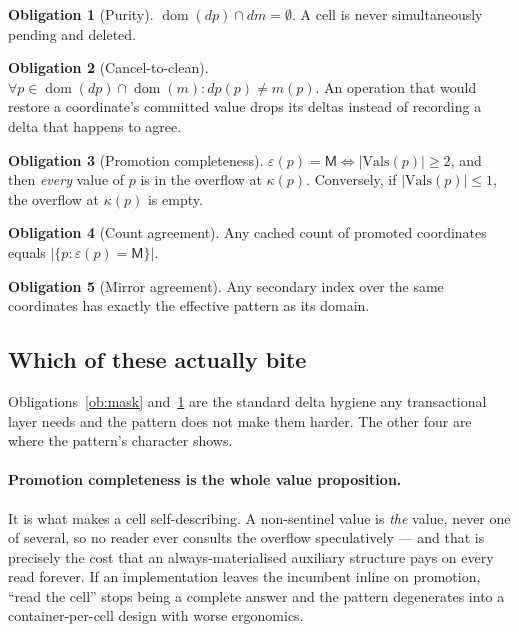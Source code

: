 \documentclass[11pt,a4paper]{article}
\theoremstyle{plain}
\theoremstyle{definition}
\newtheorem{invariant}{Obligation}
\theoremstyle{remark}
\newcommand{\M}{\mathsf{M}}
\newcommand{\dom}{\operatorname{dom}}
\begin{document}
\begin{invariant}[Purity]\label{ob:pure}
$\dom(dp) \cap dm = \emptyset$. A cell is never simultaneously pending and
deleted.
\end{invariant}

\begin{invariant}[Cancel-to-clean]\label{ob:cancel}
$\forall p \in \dom(dp) \cap \dom(m): dp(p) \neq m(p)$. An operation that would
restore a coordinate's committed value drops its deltas instead of recording a
delta that happens to agree.
\end{invariant}

\begin{invariant}[Promotion completeness]\label{ob:promo}
$\varepsilon(p) = \M \iff |\mathrm{Vals}(p)| \ge 2$, and then \emph{every}
value of $p$ is in the overflow at $\kappa(p)$. Conversely, if
$|\mathrm{Vals}(p)| \le 1$, the overflow at $\kappa(p)$ is empty.
\end{invariant}

\begin{invariant}[Count agreement]\label{ob:count}
Any cached count of promoted coordinates equals
$|\{p : \varepsilon(p) = \M\}|$.
\end{invariant}

\begin{invariant}[Mirror agreement]\label{ob:mirror}
Any secondary index over the same coordinates has exactly the effective
pattern as its domain.
\end{invariant}

\subsection{Which of these actually bite}

Obligations~\ref{ob:mask} and~\ref{ob:pure} are the standard delta hygiene any
transactional layer needs and the pattern does not make them harder. The other
four are where the pattern's character shows.

\paragraph{Promotion completeness is the whole value proposition.}
It is what makes a cell self-describing. A non-sentinel value is \emph{the}
value, never one of several, so no reader ever consults the overflow
speculatively --- and that is precisely the cost that an always-materialised
auxiliary structure pays on every read forever. If an implementation leaves the
incumbent inline on promotion, ``read the cell'' stops being a complete answer
and the pattern degenerates into a container-per-cell design with worse
ergonomics.
\end{document}
